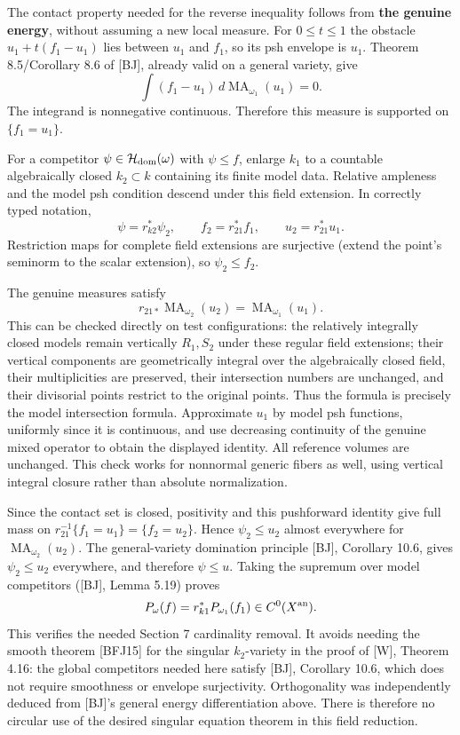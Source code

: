 \documentclass[11pt]{article}
\begin{document}
The contact property needed for the reverse inequality follows from
\textbf{the genuine energy}, without assuming a new local measure. For
\(0\leq t\leq1\) the obstacle \(u_1+t(f_1-u_1)\) lies between \(u_1\)
and \(f_1\), so its psh envelope is \(u_1\). Theorem 8.5/Corollary 8.6
of {[}BJ{]}, already valid on a general variety, give
\[\int(f_1-u_1)\,d\operatorname{MA}_{\omega_1}(u_1)=0.\] The integrand
is nonnegative continuous. Therefore this measure is supported on
\(\{f_1=u_1\}\).

For a competitor \(\psi\in\mathcal H_{\rm dom}(\omega)\) with
\(\psi\leq f\), enlarge \(k_1\) to a countable algebraically closed
\(k_2\subset k\) containing its finite model data. Relative ampleness
and the model psh condition descend under this field extension. In
correctly typed notation,
\[\psi=r_{k2}^*\psi_2,\qquad f_2=r_{21}^*f_1,\qquad u_2=r_{21}^*u_1.\]
Restriction maps for complete field extensions are surjective (extend
the point's seminorm to the scalar extension), so \(\psi_2\leq f_2\).

The genuine measures satisfy
\[r_{21*}\operatorname{MA}_{\omega_2}(u_2)=\operatorname{MA}_{\omega_1}(u_1).\]
This can be checked directly on test configurations: the relatively
integrally closed models remain vertically \(R_1,S_2\) under these
regular field extensions; their vertical components are geometrically
integral over the algebraically closed field, their multiplicities are
preserved, their intersection numbers are unchanged, and their
divisorial points restrict to the original points. Thus the formula is
precisely the model intersection formula. Approximate \(u_1\) by model
psh functions, uniformly since it is continuous, and use decreasing
continuity of the genuine mixed operator to obtain the displayed
identity. All reference volumes are unchanged. This check works for
nonnormal generic fibers as well, using vertical integral closure rather
than absolute normalization.

Since the contact set is closed, positivity and this pushforward
identity give full mass on \(r_{21}^{-1}\{f_1=u_1\}=\{f_2=u_2\}\). Hence
\(\psi_2\leq u_2\) almost everywhere for
\(\operatorname{MA}_{\omega_2}(u_2)\). The general-variety domination
principle {[}BJ{]}, Corollary 10.6, gives \(\psi_2\leq u_2\) everywhere,
and therefore \(\psi\leq u\). Taking the supremum over model competitors
({[}BJ{]}, Lemma 5.19) proves
\[P_\omega(f)=r_{k1}^*P_{\omega_1}(f_1)\in C^0(X^{\rm an}).\] This
verifies the needed Section 7 cardinality removal. It avoids needing the
smooth theorem {[}BFJ15{]} for the singular \(k_2\)-variety in the proof
of {[}W{]}, Theorem 4.16: the global competitors needed here satisfy
{[}BJ{]}, Corollary 10.6, which does not require smoothness or envelope
surjectivity. Orthogonality was independently deduced from {[}BJ{]}'s
general energy differentiation above. There is therefore no circular use
of the desired singular equation theorem in this field reduction.
\end{document}
